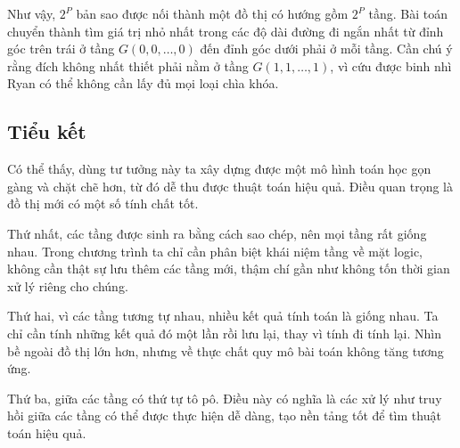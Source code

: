 \documentclass[11pt]{article}
\begin{document}
Như vậy, $2^P$ bản sao được nối thành một đồ thị có hướng gồm $2^P$ tầng.
Bài toán chuyển thành tìm giá trị nhỏ nhất trong các độ dài đường đi ngắn
nhất từ đỉnh góc trên trái ở tầng $G(0,0,\ldots,0)$ đến đỉnh góc dưới phải ở
mỗi tầng. Cần chú ý rằng đích không nhất thiết phải nằm ở tầng
$G(1,1,\ldots,1)$, vì cứu được binh nhì Ryan có thể không cần lấy đủ mọi loại
chìa khóa.

\begin{center}
\end{center}

\subsection{Tiểu kết}

Có thể thấy, dùng tư tưởng này ta xây dựng được một mô hình toán học gọn gàng
và chặt chẽ hơn, từ đó dễ thu được thuật toán hiệu quả. Điều quan trọng là đồ
thị mới có một số tính chất tốt.

Thứ nhất, các tầng được sinh ra bằng cách sao chép, nên mọi tầng rất giống
nhau. Trong chương trình ta chỉ cần phân biệt khái niệm tầng về mặt logic,
không cần thật sự lưu thêm các tầng mới, thậm chí gần như không tốn thời gian
xử lý riêng cho chúng.

Thứ hai, vì các tầng tương tự nhau, nhiều kết quả tính toán là giống nhau.
Ta chỉ cần tính những kết quả đó một lần rồi lưu lại, thay vì tính đi tính
lại. Nhìn bề ngoài đồ thị lớn hơn, nhưng về thực chất quy mô bài toán không
tăng tương ứng.

Thứ ba, giữa các tầng có thứ tự tô pô. Điều này có nghĩa là các xử lý như
truy hồi giữa các tầng có thể được thực hiện dễ dàng, tạo nền tảng tốt để
tìm thuật toán hiệu quả.
\end{document}
